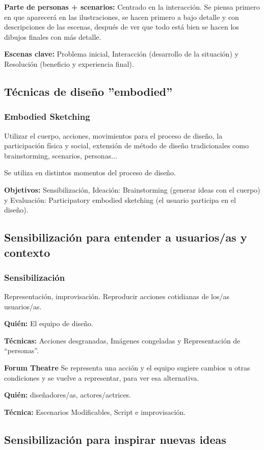 \documentclass[12pt, twoside, openright]{report} %
\begin{document}
\textbf{Parte de personas + scenarios:} Centrado en la interacción. Se piensa primero en que aparecerá en las ilustraciones, se hacen primero a bajo detalle y con descripciones de las escenas, después de ver que todo está bien se hacen los dibujos finales con más detalle.

\textbf{Escenas clave:} Problema inicial, Interacción (desarrollo de la situación) y Resolución (beneficio y experiencia final).

\subsection{Técnicas de diseño ”embodied”}
\subsubsection{Embodied Sketching}
Utilizar el cuerpo, acciones, movimientos para el proceso de diseño, la participación física y social, extensión de método de diseño tradicionales como brainstorming, scenarios, personas...

Se utiliza en distintos momentos del proceso de diseño.

\textbf{Objetivos:} Sensibilización, Ideación: Brainstorming (generar ideas con el cuerpo) y Evaluación: Participatory embodied sketching (el usuario participa en el diseño).

\subsection{Sensibilización para entender a usuarios/as y contexto}
\subsubsection{Sensibilización}
Representación, improvisación. Reproducir acciones cotidianas de los/as usuarios/as.

\textbf{Quién:} El equipo de diseño.

\textbf{Técnicas:} Acciones desgranadas, Imágenes congeladas y Representación de “personas”.


\textbf{Forum Theatre}
Se representa una acción y el equipo sugiere cambios u otras condiciones y se vuelve a representar, para ver esa alternativa.

\textbf{Quién:} diseñadores/as, actores/actrices.

\textbf{Técnica:} Escenarios Modificables, Script e improvisación.

\subsection{Sensibilización para inspirar nuevas ideas}
\end{document}
